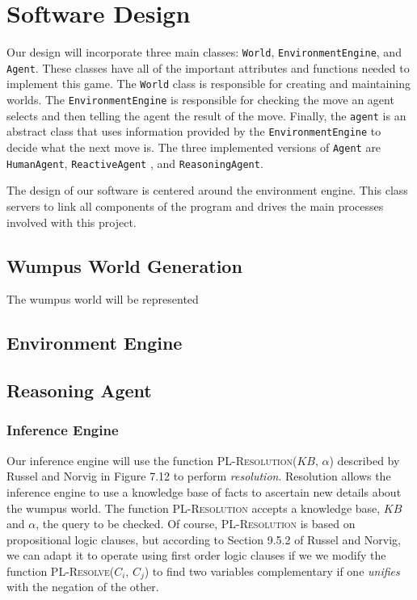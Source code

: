 \documentclass{article}
\begin{document}
	\section{Software Design}
		Our design will incorporate three main classes: \texttt{World}, \texttt{EnvironmentEngine}, and \texttt{Agent}. 
		These classes have all of the important attributes and functions needed to implement this game.
		The \texttt{World} class is responsible for creating and maintaining worlds. The \texttt{EnvironmentEngine} is responsible for checking the move an agent selects and then telling the agent the result of the move. Finally, the \texttt{agent} is an abstract class that uses information provided by the \texttt{EnvironmentEngine} to decide what the next move is. The three implemented versions of \texttt{Agent} are \texttt{HumanAgent}, \texttt{ReactiveAgent} , and \texttt{ReasoningAgent}.
	
		The design of our software is centered around the environment engine. This class servers to link all components of the program and drives the main processes involved with this project. 

		
		\subsection{Wumpus World Generation}
		
			The wumpus world will be represented 
		
		\subsection{Environment Engine}
		
		\subsection{Reasoning Agent}
		
			\subsubsection{Inference Engine}
			
				Our inference engine will use the function \textsc{PL-Resolution}($KB$, $\alpha$) described by Russel and Norvig in Figure 7.12 \cite{ai} to perform \textit{resolution}. 
				Resolution allows the inference engine to use a knowledge base of facts to ascertain new details about the wumpus world. 
				The function \textsc{PL-Resolution} accepts a knowledge base, $KB$ and $\alpha$, the query to be checked. Of course, \textsc{PL-Resolution} is based on propositional logic clauses, but according to Section 9.5.2 of Russel and Norvig, we can adapt it to operate using first order logic clauses if we we modify the function \textsc{PL-Resolve($C_i$, $C_j$)} to find two variables complementary if one \textit{unifies} with the negation of the other. 
				
\end{document}
